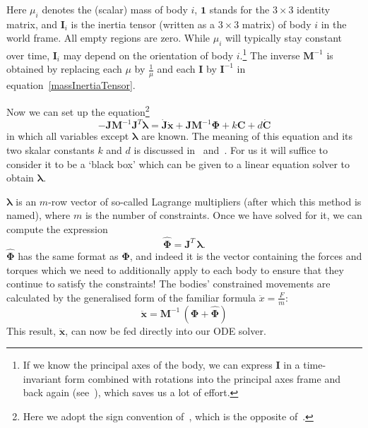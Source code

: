 Here $\mu_i$ denotes the (scalar) mass of body $i$, $\mathbf{1}$ stands for the $3\times3$
identity matrix, and $\mathbf{I}_i$ is the inertia tensor (written as a $3\times3$ matrix)
of body $i$ in the world frame. All empty regions are zero. While $\mu_i$ will typically
stay constant over time, $\mathbf{I}_i$ may depend on the orientation of body $i$.\footnote{If
we know the principal axes of the body, we can express $\mathbf{I}$ in a time-invariant
form combined with rotations into the principal axes frame and back again
(see~\cite{BaraffWitkin:97}), which saves us a lot of effort.} The inverse $\mathbf{M}^{-1}$
is obtained by replacing each $\mu$ by $\frac{1}{\mu}$ and each $\mathbf{I}$ by
$\mathbf{I}^{-1}$ in equation~\ref{massInertiaTensor}.

Now we can set up the equation\footnote{Here we adopt the sign convention
of~\cite{BaraffWitkin:97}, which is the opposite of~\cite{Saunders:PhD}.}
\begin{equation}
\label{lagrangeEquation}
-\mathbf{JM}^{-1}\mathbf{J}^T\bm{\lambda} = \dot{\mathbf{J}}\dot{\mathbf{x}} +
    \mathbf{JM}^{-1}\bm{\Phi} + k\mathbf{C} + d\dot{\mathbf{C}}
\end{equation}
in which all variables except $\bm{\lambda}$ are known. The meaning of this equation and
its two skalar constants $k$ and $d$ is discussed in~\cite{BaraffWitkin:97}
and~\cite{Saunders:PhD}. For us it will suffice to consider it to be a `black box' which can be
given to a linear equation solver to obtain $\bm{\lambda}$.

$\bm{\lambda}$ is an $m$-row vector of so-called Lagrange multipliers (after which this method
is named), where $m$ is the number of constraints. Once we have solved for it, we can compute
the expression
\begin{equation}
\hat{\bm{\Phi}} = \mathbf{J}^T\,\bm{\lambda}.
\end{equation}
$\hat{\bm{\Phi}}$ has the same format as $\bm{\Phi}$, and indeed it is the vector containing
the forces and torques which we need to additionally apply to each body to ensure that they
continue to satisfy the constraints! The bodies' constrained movements are calculated by
the generalised form of the familiar formula $\ddot{x} = \frac{F}{m}$:
\begin{equation}
\ddot{\mathbf{x}} = \mathbf{M}^{-1}\,(\bm{\Phi} + \hat{\bm{\Phi}})
\end{equation}
This result, $\ddot{\mathbf{x}}$, can now be fed directly into our ODE solver.
